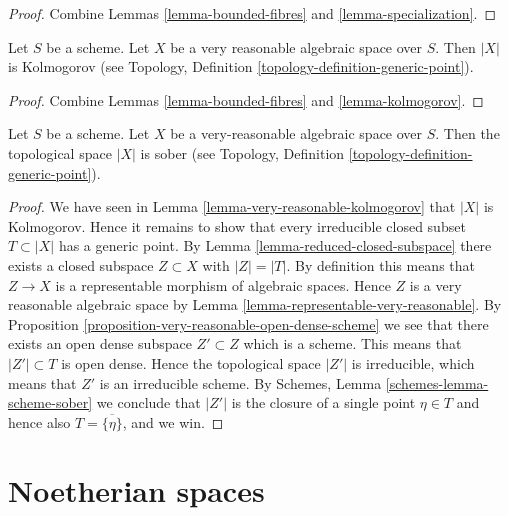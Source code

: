 \begin{proof}
Combine Lemmas \ref{lemma-bounded-fibres} and
\ref{lemma-specialization}.
\end{proof}

\begin{lemma}
\label{lemma-very-reasonable-kolmogorov}
Let $S$ be a scheme.
Let $X$ be a very reasonable algebraic space over $S$.
Then $|X|$ is Kolmogorov (see
Topology, Definition \ref{topology-definition-generic-point}).
\end{lemma}

\begin{proof}
Combine Lemmas \ref{lemma-bounded-fibres} and
\ref{lemma-kolmogorov}.
\end{proof}

\begin{proposition}
\label{proposition-very-reasonable-sober}
Let $S$ be a scheme.
Let $X$ be a very-reasonable algebraic space over $S$.
Then the topological space $|X|$ is sober (see
Topology, Definition \ref{topology-definition-generic-point}).
\end{proposition}

\begin{proof}
We have seen in
Lemma \ref{lemma-very-reasonable-kolmogorov}
that $|X|$ is Kolmogorov.
Hence it remains to show that every irreducible closed subset
$T \subset |X|$ has a generic point. By
Lemma \ref{lemma-reduced-closed-subspace}
there exists a closed subspace $Z \subset X$ with $|Z| = |T|$.
By definition this means that $Z \to X$ is a representable morphism
of algebraic spaces. Hence $Z$ is a very reasonable algebraic space
by Lemma \ref{lemma-representable-very-reasonable}. By
Proposition \ref{proposition-very-reasonable-open-dense-scheme}
we see that there exists an open dense subspace $Z' \subset Z$
which is a scheme. This means that $|Z'| \subset T$ is open dense.
Hence the topological space $|Z'|$ is irreducible, which means that
$Z'$ is an irreducible scheme. By
Schemes, Lemma \ref{schemes-lemma-scheme-sober}
we conclude that $|Z'|$ is the closure of a single point $\eta \in T$
and hence also $T = \overline{\{\eta\}}$, and we win.
\end{proof}










\section{Noetherian spaces}
\label{section-noetherian}

